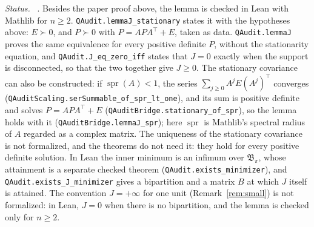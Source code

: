 \emph{Status.} \stA\ \stM. Besides the paper proof above, the lemma is checked in Lean with Mathlib for $n\ge2$. \texttt{QAudit.lemmaJ\_stationary} states it with the hypotheses above: $E\succ0$, and $P\succ0$ with $P=APA^\top+E$, taken as data. \texttt{QAudit.lemmaJ} proves the same equivalence for every positive definite $P$, without the stationarity equation, and \texttt{QAudit.J\_eq\_zero\_iff} states that $J=0$ exactly when the support is disconnected, so that the two together give $J\ge0$. The stationary covariance can also be constructed: if $\operatorname{spr}(A)<1$, the series $\sum_{j\ge0}A^jE(A^j)^\top$ converges (\texttt{QAuditScaling.serSummable\_of\_spr\_lt\_one}), and its sum is positive definite and solves $P=APA^\top+E$ (\texttt{QAuditBridge.stationary\_of\_spr}), so the lemma holds with it (\texttt{QAuditBridge.lemmaJ\_spr}); here $\operatorname{spr}$ is Mathlib's spectral radius of $A$ regarded as a complex matrix. The uniqueness of the stationary covariance is not formalized, and the theorems do not need it: they hold for every positive definite solution. In Lean the inner minimum is an infimum over $\mathfrak B_\pi$, whose attainment is a separate checked theorem (\texttt{QAudit.exists\_minimizer}), and \texttt{QAudit.exists\_J\_minimizer} gives a bipartition and a matrix $B$ at which $J$ itself is attained. The convention $J=+\infty$ for one unit (Remark~\ref{rem:small}) is not formalized: in Lean, $J=0$ when there is no bipartition, and the lemma is checked only for $n\ge2$.

